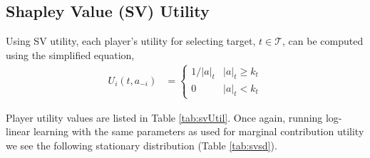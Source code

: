 \documentclass[11pt, onecolumn, compsoc, letterpaper]{article}
\newcommand{\Ta}{\mathcal{T}} %
\begin{document}
\subsection{Shapley Value (SV) Utility}
Using SV utility, each player's utility for selecting target, $t \in \Ta$, can be computed using the simplified equation,
\begin{align}
	U_i(t, a_{-i}) & = \left\{
		\begin{array}{ll}	
			1/|a|_t & |a|_t \geq k_t\\
			0 & |a|_t < k_t
		\end{array}\right.
\end{align}

Player utility values are listed in Table \ref{tab:svUtil}. Once again, running log-linear learning with the same parameters as used for marginal contribution utility we see the following stationary distribution (Table \ref{tab:svsd}).
\end{document}

